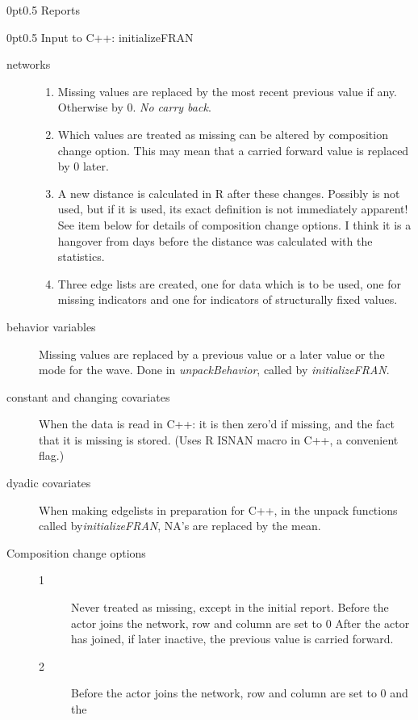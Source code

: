 \documentclass[12pt,a4paper]{article}
\makeatletter
\renewcommand{\=}{\,=\,}
\newcommand{\+}{\,+\,}
\newcommand{\nnm}[1]{\textsf{\small\textit{#1}}}
\renewcommand{\section}{\@startsection{section}{1}
                {0pt}{\baselineskip}{0.5\baselineskip}
                {\centering\sffamily} }
\makeatother
\begin{document}
\section{Reports}

\section{Input to C++: initializeFRAN}
\begin{description}
\item[networks]\hfill
\begin{enumerate}
\item Missing values are replaced by the most recent previous value if
  any. Otherwise by 0. \emph{No carry back}.
\item Which values are treated as missing can be altered by composition change
  option. This may mean that a carried forward value is replaced
  by 0 later.
\item A new distance is calculated in R after these changes. Possibly is not
  used, but if it is used, its exact definition is not immediately apparent! See
  item below for details of composition change options. I think it is a hangover
  from days before the distance was calculated with the statistics.
\item Three edge lists are created, one for data which is to be used, one for
  missing indicators and one for indicators of structurally fixed values.
\end{enumerate}
\item[behavior variables] Missing values are replaced by a previous value or a
  later value or the mode for the wave. Done in \nnm{unpackBehavior}, called by
  \nnm{initializeFRAN}.
\item[constant and changing covariates] When the data is read in C++: it is then
  zero'd if missing, and the fact that it is missing is stored.
 (Uses R ISNAN macro in C++, a convenient flag.)
\item[dyadic covariates] When making edgelists in preparation for C++, in the
  unpack functions called by\nnm{initializeFRAN}, NA's are replaced by the mean.
\item[Composition change options]\hfill
\begin{description}
\item[1] Never treated as missing, except in the initial report.
Before the actor joins the network, row and column are set to 0
After the actor has joined, if later inactive, the previous
value is carried forward.
\item[2] Before the actor joins the network, row and column are set to 0 and the

\end{description}
\end{description}
\end{document}
